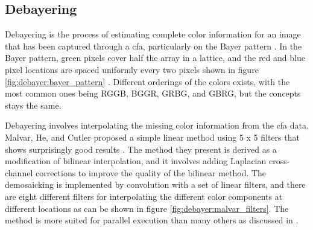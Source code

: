 \subsection{Debayering}
Debayering is the process of estimating complete color information for an image that has been captured through a \gls{cfa}, particularly on the Bayer pattern \cite{getreuerMalvarHeCutlerLinearImage2011}.
In the Bayer pattern, green pixels cover half the array in a lattice, and the red and blue pixel locations are spaced uniformly every two pixels shown in figure \ref{fig:debayer:bayer_pattern} \cite{getreuerMalvarHeCutlerLinearImage2011}.
Different orderings of the colors exists, with the most common ones being RGGB, BGGR, GRBG, and GBRG, but the concepts stays the same.

Debayering involves interpolating the missing color information from the \gls{cfa} data.
Malvar, He, and Cutler proposed a simple linear method using 5 x 5 filters that shows surprisingly good results \cite{getreuerMalvarHeCutlerLinearImage2011}.
The method they present is derived as a modification of bilinear interpolation, and it involves adding Laplacian cross-channel corrections to improve the quality of the bilinear method.
The demosaicking is implemented by convolution with a set of linear filters, and there are eight different filters for interpolating the different color components at different locations as can be shown in figure \ref{fig:debayer:malvar_filters}.
The method is more suited for parallel execution than many others as discussed in \todo.


